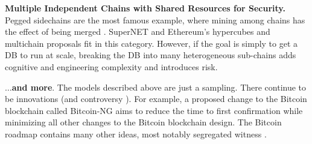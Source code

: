 \medskip
\noindent\textbf{Multiple Independent Chains with Shared Resources for Security.} Pegged sidechains are the most famous example, where mining among chains has the effect of being merged \cite{back2002hashcash}. 
SuperNET \cite{galt2014supernet} and Ethereum’s hypercubes and multichain proposals \cite{buterin2014hypercubes} fit in this category. 
However, if the goal is simply to get a DB to run at scale, breaking the DB into many heterogeneous sub-chains adds cognitive and engineering complexity and introduces risk.

\medskip
\noindent\textbf{$\dots$and more}. The models described above are just a sampling. 
There continue to be innovations (and controversy \cite{bitcoin-blocksize, popper2016bitcoin_crisis}). 
For example, a proposed change to the Bitcoin blockchain called Bitcoin-NG \cite{eyal2015bitcoin} aims to reduce the time to first confirmation while minimizing all other changes to the Bitcoin blockchain design. 
The Bitcoin roadmap \cite{bitcoin2015capacity, maxwell2015capacity} contains many other ideas, most notably segregated witness \cite{wuille_segregated_witness}.